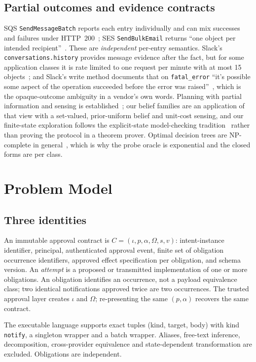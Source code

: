 \documentclass[conference,10pt]{IEEEtran}
\newcommand{\Om}{\Omega}
\begin{document}
\subsection{Partial outcomes and evidence contracts}
SQS \texttt{SendMessageBatch} reports each entry individually and can mix successes and failures under HTTP~200~\cite{sqsbatch}; SES \texttt{SendBulkEmail} returns ``one object per intended recipient''~\cite{ses}. These are \emph{independent} per-entry semantics. Slack's \texttt{conversations.history} provides message evidence after the fact, but for some application classes it is rate limited to one request per minute with at most 15 objects~\cite{slackhistory}; and Slack's write method documents that on \texttt{fatal\_error} ``it's possible some aspect of the operation succeeded before the error was raised''~\cite{slackpost}, which is the opaque-outcome ambiguity in a vendor's own words. Planning with partial information and sensing is established~\cite{brafman,kaelbling}; our belief families are an application of that view with a set-valued, prior-uniform belief and unit-cost sensing, and our finite-state exploration follows the explicit-state model-checking tradition~\cite{spin} rather than proving the protocol in a theorem prover. Optimal decision trees are NP-complete in general~\cite{hyafil}, which is why the probe oracle is exponential and the closed forms are per class.

\section{Problem Model}

\subsection{Three identities}
An immutable approval contract is $C=(\iota,p,\alpha,\Om,s,v)$: intent-instance identifier, principal, authenticated approval event, finite set of obligation occurrence identifiers, approved effect specification per obligation, and schema version. An \emph{attempt} is a proposed or transmitted implementation of one or more obligations. An obligation identifies an occurrence, not a payload equivalence class; two identical notifications approved twice are two occurrences. The trusted approval layer creates $\iota$ and $\Om$; re-presenting the same $(p,\alpha)$ recovers the same contract.

The executable language supports exact tuples (kind, target, body) with kind \texttt{notify}, a singleton wrapper and a batch wrapper. Aliases, free-text inference, decomposition, cross-provider equivalence and state-dependent transformation are excluded. Obligations are independent.
\end{document}
